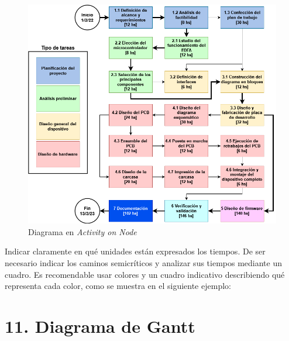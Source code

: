 \documentclass[
11pt, %
codirector, %
]{charter}
\begin{document}
\begin{figure}[H]
\centering 
\includegraphics[width=.8\textwidth]{./Figuras/AoN.png}
\caption{Diagrama en \textit{Activity on Node}}
\label{fig:AoN}
\end{figure}

Indicar claramente en qué unidades están expresados los tiempos.
De ser necesario indicar los caminos semicríticos y analizar sus tiempos mediante un cuadro.
Es recomendable usar colores y un cuadro indicativo describiendo qué representa cada color, como se muestra en el siguiente ejemplo:



\section{11. Diagrama de Gantt}
\label{sec:gantt}
\end{document}
